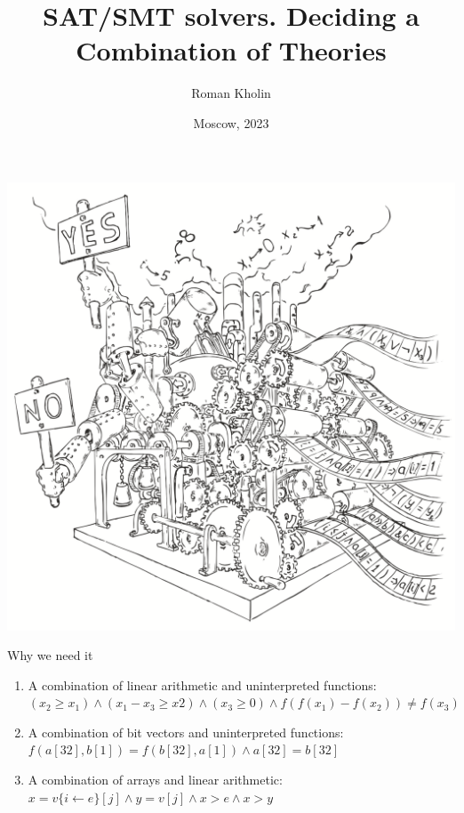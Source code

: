 \documentclass{beamer}
\begin{document}
\title{SAT/SMT solvers. Deciding a Combination of Theories}
\author{Roman Kholin}
\date{Moscow, 2023}

\begin{frame}
\includegraphics[scale=0.5]{../decision-procedure.png}
\end{frame}

\frame{\titlepage}

\begin{frame}{Why we need it}
\begin{enumerate}
\item A combination of linear arithmetic and uninterpreted functions:\newline
$(x_2 \ge x_1 ) \wedge (x_1 - x_3 \ge x 2 ) \wedge (x_3 \ge 0) \wedge f(f(x_1) - f(x_2)) \ne f(x_3)$
\item A combination of bit vectors and uninterpreted functions:\newline
$f(a[32], b[1]) = f (b[32], a[1]) \wedge a[32] = b[32]$
\item A combination of arrays and linear arithmetic:
$x = v\{i \leftarrow e\}[j] \wedge y = v[j] \wedge x > e \wedge x > y$
\end{enumerate}
\end{frame}
\end{document}
